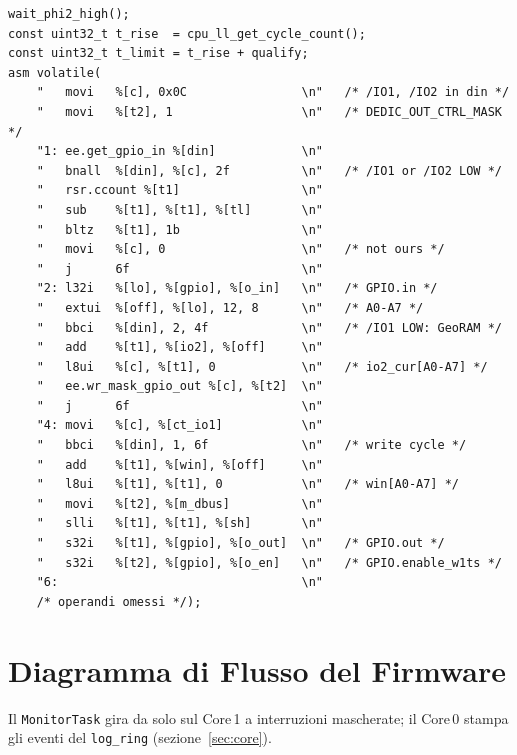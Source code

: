 \documentclass[12pt, a4paper]{article}
\begin{document}
\begin{lstlisting}[style=cppstyle, caption={Percorso critico del MonitorTask (Core\,1), assembly inline}, label=code:monitor_task]
wait_phi2_high();
const uint32_t t_rise  = cpu_ll_get_cycle_count();
const uint32_t t_limit = t_rise + qualify;
asm volatile(
    "   movi   %[c], 0x0C                \n"   /* /IO1, /IO2 in din */
    "   movi   %[t2], 1                  \n"   /* DEDIC_OUT_CTRL_MASK */
    "1: ee.get_gpio_in %[din]            \n"
    "   bnall  %[din], %[c], 2f          \n"   /* /IO1 or /IO2 LOW */
    "   rsr.ccount %[t1]                 \n"
    "   sub    %[t1], %[t1], %[tl]       \n"
    "   bltz   %[t1], 1b                 \n"
    "   movi   %[c], 0                   \n"   /* not ours */
    "   j      6f                        \n"
    "2: l32i   %[lo], %[gpio], %[o_in]   \n"   /* GPIO.in */
    "   extui  %[off], %[lo], 12, 8      \n"   /* A0-A7 */
    "   bbci   %[din], 2, 4f             \n"   /* /IO1 LOW: GeoRAM */
    "   add    %[t1], %[io2], %[off]     \n"
    "   l8ui   %[c], %[t1], 0            \n"   /* io2_cur[A0-A7] */
    "   ee.wr_mask_gpio_out %[c], %[t2]  \n"
    "   j      6f                        \n"
    "4: movi   %[c], %[ct_io1]           \n"
    "   bbci   %[din], 1, 6f             \n"   /* write cycle */
    "   add    %[t1], %[win], %[off]     \n"
    "   l8ui   %[t1], %[t1], 0           \n"   /* win[A0-A7] */
    "   movi   %[t2], %[m_dbus]          \n"
    "   slli   %[t1], %[t1], %[sh]       \n"
    "   s32i   %[t1], %[gpio], %[o_out]  \n"   /* GPIO.out */
    "   s32i   %[t2], %[gpio], %[o_en]   \n"   /* GPIO.enable_w1ts */
    "6:                                  \n"
    /* operandi omessi */);
\end{lstlisting}

\section{Diagramma di Flusso del Firmware}
Il \texttt{MonitorTask} gira da solo sul Core\,1 a interruzioni mascherate; il Core\,0 stampa gli eventi del \texttt{log\_ring} (sezione~\ref{sec:core}).
\end{document}
